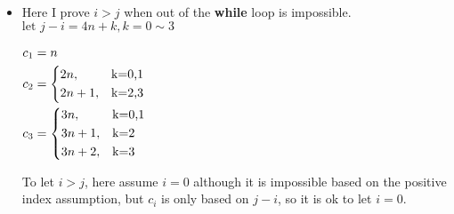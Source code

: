 \documentclass{article}
\edef\mylb{\\}
\newenvironment{CondensedAlign}{%



\addtolength{\jot}{-5pt}

  \par\vspace{0ex}%
  $\displaystyle\aligned
}{
  \endaligned$
  \par\vspace{+1ex}%
  \renewcommand{\\}{\mylb}
}
\begin{document}
\begin{todolist}[itemsep=0pt,parsep=0pt,start=3]
    \begin{itemize}
        \item Here I prove $i>j$ when out of the \textbf{while} loop is impossible.\\
              $\text{let }j-i=4n+k,k=0\sim 3$
              \begin{CondensedAlign}
                  c_1 & =n      \\
                  c_2 & =
                  \begin{cases*}
                      2n,   & k=0,1 \\
                      2n+1, & k=2,3
                  \end{cases*}\\
                  c_3 & =
                  \begin{cases*}
                      3n,   & k=0,1 \\
                      3n+1, & k=2   \\
                      3n+2, & k=3
                  \end{cases*}
              \end{CondensedAlign}
              To let $i>j$, here assume $i=0$
              although it is impossible based on the positive index assumption,
              but $c_i$ is only based on $j-i$, so it is ok to let $i=0$.



\end{itemize}
\end{todolist}
\end{document}
